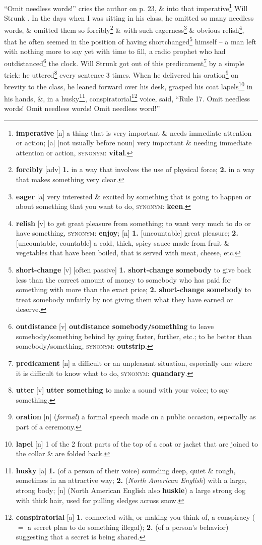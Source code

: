 \documentclass{article}
\begin{document}
``Omit needless words!'' cries the author on p. 23, \& into that imperative\footnote{{\bf imperative} [n] a thing that is very important \& needs immediate attention or action; [a] [not usually before noun] very important \& needing immediate attention or action, \textsc{synonym}: {\bf vital}.} Will Strunk . In the days when I was sitting in his class, he omitted so many needless words, \& omitted them so forcibly\footnote{{\bf forcibly} [adv] {\bf 1.} in a way that involves the use of physical force; {\bf 2.} in a way that makes something very clear.} \& with such eagerness\footnote{{\bf eager} [a] very interested \& excited by something that is going to happen or about something that you want to do, \textsc{synonym}: {\bf keen}.} \& obvious relish\footnote{{\bf relish} [v] to get great pleasure from something; to want very much to do or have something, \textsc{synonym}: {\bf enjoy}; [n] {\bf 1.} [uncountable] great pleasure; {\bf 2.} [uncountable, countable] a cold, thick, spicy sauce made from fruit \& vegetables that have been boiled, that is served with meat, cheese, etc.}, that he often seemed in the position of having shortchanged\footnote{{\bf short-change} [v] [often passive] {\bf 1. short-change somebody} to give back less than the correct amount of money to somebody who has paid for something with more than the exact price; {\bf 2. short-change somebody} to treat somebody unfairly by not giving them what they have earned or deserve.} himself -- a man left with nothing more to say yet with time to fill, a radio prophet who had outdistanced\footnote{{\bf outdistance} [v] {\bf outdistance somebody{\tt/}something} to leave somebody{\tt/}something behind by going faster, further, etc.; to be better than somebody{\tt/}something, \textsc{synonym}: {\bf outstrip}.} the clock. Will Strunk got out of this predicament\footnote{{\bf predicament} [n] a difficult or an unpleasant situation, especially one where it is difficult to know what to do, \textsc{synonym}: {\bf quandary}.} by a simple trick: he uttered\footnote{{\bf utter} [v] {\bf utter something} to make a sound with your voice; to say something.} every sentence 3 times. When he delivered his oration\footnote{{\bf oration} [n] ({\it formal}) a formal speech made on a public occasion, especially as part of a ceremony.} on brevity to the class, he leaned forward over his desk, grasped his coat lapels\footnote{{\bf lapel} [n] 1 of the 2 front parts of the top of a coat or jacket that are joined to the collar \& are folded back.} in his hands, \&, in a husky\footnote{{\bf husky} [a] {\bf 1.} (of a person of their voice) sounding deep, quiet \& rough, sometimes in an attractive way; {\bf 2.} ({\it North American English}) with a large, strong body; [n] (North American English also {\bf huskie}) a large strong dog with thick hair, used for pulling sledges across snow.}, conspiratorial\footnote{{\bf conspiratorial} [a] {\bf 1.} connected with, or making you think of, a conspiracy ($=$ a secret plan to do something illegal); {\bf 2.} (of a person's behavior) suggesting that a secret is being shared.} voice, said, ``Rule 17. Omit needless words! Omit needless words! Omit needless word!''
\end{document}
